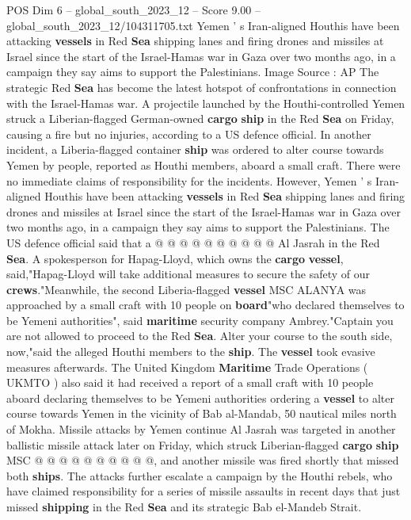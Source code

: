 \begin{textsample}{POS Dim 6 – global\_south\_2023\_12 – Score 9.00 – global\_south\_2023\_12/104311705.txt}  \label{ex:f6_pos_107}
Yemen ' s Iran-aligned Houthis have been attacking \textbf{vessels} in Red \textbf{Sea} shipping lanes and firing drones and missiles at Israel since the start of the Israel-Hamas war in Gaza over two months ago, in a campaign they say aims to support the Palestinians.
Image Source : AP The strategic Red \textbf{Sea} has become the latest hotspot of confrontations in connection with the Israel-Hamas war.
A projectile launched by the Houthi-controlled Yemen struck a Liberian-flagged German-owned \textbf{cargo} \textbf{ship} in the Red \textbf{Sea} on Friday, causing a fire but no injuries, according to a US defence official.
In another incident, a Liberia-flagged container \textbf{ship} was ordered to alter course towards Yemen by people, reported as Houthi members, aboard a small craft.
There were no immediate claims of responsibility for the incidents.
However, Yemen ' s Iran-aligned Houthis have been attacking \textbf{vessels} in Red \textbf{Sea} shipping lanes and firing drones and missiles at Israel since the start of the Israel-Hamas war in Gaza over two months ago, in a campaign they say aims to support the Palestinians.
The US defence official said that a @ @ @ @ @ @ @ @ @ @ Al Jasrah in the Red \textbf{Sea}.
A spokesperson for Hapag-Lloyd, which owns the \textbf{cargo} \textbf{vessel}, said,"Hapag-Lloyd will take additional measures to secure the safety of our \textbf{crews}."Meanwhile, the second Liberia-flagged \textbf{vessel} MSC ALANYA was approached by a small craft with 10 people on \textbf{board}"who declared themselves to be Yemeni authorities", said \textbf{maritime} security company Ambrey."Captain you are not allowed to proceed to the Red \textbf{Sea}.
Alter your course to the south side, now,"said the alleged Houthi members to the \textbf{ship}.
The \textbf{vessel} took evasive measures afterwards.
The United Kingdom \textbf{Maritime} Trade Operations ( UKMTO ) also said it had received a report of a small craft with 10 people aboard declaring themselves to be Yemeni authorities ordering a \textbf{vessel} to alter course towards Yemen in the vicinity of Bab al-Mandab, 50 nautical miles north of Mokha.
Missile attacks by Yemen continue Al Jasrah was targeted in another ballistic missile attack later on Friday, which struck Liberian-flagged \textbf{cargo} \textbf{ship} MSC @ @ @ @ @ @ @ @ @ @, and another missile was fired shortly that missed both \textbf{ships}.
The attacks further escalate a campaign by the Houthi rebels, who have claimed responsibility for a series of missile assaults in recent days that just missed \textbf{shipping} in the Red \textbf{Sea} and its strategic Bab el-Mandeb Strait.

\end{textsample}
